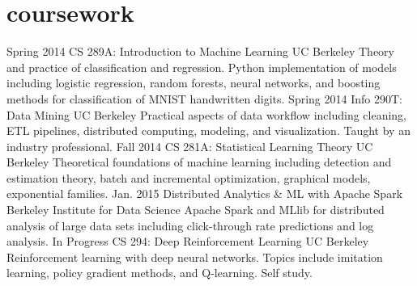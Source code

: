 \documentclass[]{friggeri-cv} %
\begin{document}
\section{coursework}

\begin{entrylist}
\entry
{Spring 2014}
{CS 289A: Introduction to Machine Learning}
{UC Berkeley}
{Theory and practice of classification and regression. Python implementation of models including logistic regression, random forests, neural networks, and boosting methods for classification of MNIST handwritten digits.} 
\entry
{Spring 2014}
{Info 290T: Data Mining}
{UC Berkeley}
{Practical aspects of data workflow including cleaning, ETL pipelines, distributed computing, modeling, and visualization. Taught by an industry professional.}
\entry
{Fall 2014}
{CS 281A: Statistical Learning Theory}
{UC Berkeley}
{Theoretical foundations of machine learning including detection and estimation theory, batch and incremental optimization, graphical models, exponential families.}
\entry
{Jan. 2015}
{Distributed Analytics \& ML with Apache Spark}
{Berkeley Institute for Data Science}
{Apache Spark and MLlib for distributed analysis of large data sets including click-through rate predictions and log analysis.}
\entry
{In Progress}
{CS 294: Deep Reinforcement Learning}
{UC Berkeley}
{Reinforcement learning with deep neural networks. Topics include imitation learning, policy gradient methods, and Q-learning. Self study.}
\end{entrylist}
\end{document}
